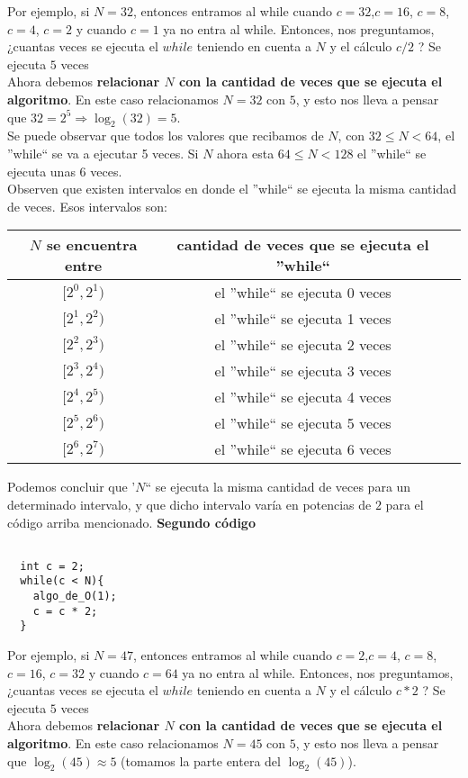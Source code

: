 Por ejemplo, si $N=32$, entonces entramos al while cuando $c=32$,$c=16$, $c=8$, $c=4$, $c=2$ y cuando $c=1$ ya no entra al while. Entonces, nos preguntamos, ¿cuantas veces se ejecuta el $while$ teniendo en cuenta a $N$ y el cálculo $c/2$ ? Se ejecuta $5$ veces\\
Ahora debemos { \bf relacionar $N$ con la cantidad de veces que se ejecuta el algoritmo}. En este caso relacionamos $N=32$ con $5$, y esto nos lleva a pensar que $32= 2^5 \Rightarrow \log_2(32)=5$. \\

Se puede observar que todos los valores que recibamos de $N$, con $32 \leq N < 64$, el ''while`` se va a ejecutar 5 veces. Si $N$ ahora esta $64 \leq N < 128$ el ''while`` se ejecuta unas 6 veces. \\
Observen que existen intervalos en donde el ''while`` se ejecuta la misma cantidad de veces. Esos intervalos son: \\

\begin{tabular}{ccc}
\\ 
$N$ se encuentra entre & cantidad de veces que se ejecuta el ''while`` \\ \hline
$[2^0, 2^1)$ & el ''while`` se ejecuta 0 veces \\ 
$[2^1, 2^2)$ & el ''while`` se ejecuta 1 veces \\
$[2^2, 2^3)$ & el ''while`` se ejecuta 2 veces \\
$[2^3, 2^4)$ & el ''while`` se ejecuta 3 veces \\
$[2^4, 2^5)$ & el ''while`` se ejecuta 4 veces \\
$[2^5, 2^6)$ & el ''while`` se ejecuta 5 veces \\
$[2^6, 2^7)$ & el ''while`` se ejecuta 6 veces \\
\end{tabular}
\newline

Podemos concluir que '$N$`` se ejecuta la misma cantidad de veces para  un determinado intervalo, y que dicho intervalo varía en potencias de $2$ para el código arriba mencionado.\newline
\newline
\textbf{Segundo código}\\

\begin{verbatim}
 
  int c = 2;
  while(c < N){
    algo_de_O(1);
    c = c * 2;  
  }   
\end{verbatim}


Por ejemplo, si $N=47$, entonces entramos al while cuando $c=2$,$c=4$, $c=8$, $c=16$, $c=32$ y cuando $c=64$ ya no entra al while. Entonces, nos preguntamos, ¿cuantas veces se ejecuta el $while$ teniendo en cuenta a $N$ y el cálculo $c*2$ ? Se ejecuta $5$ veces\\
Ahora debemos {\bf relacionar $N$ con la cantidad  de veces que se ejecuta el algoritmo}. En este caso relacionamos $N=45$ con $5$, y esto nos lleva a pensar que $\log_2(45) \approx 5$ (tomamos la parte entera del $\log_2(45)$). \\

